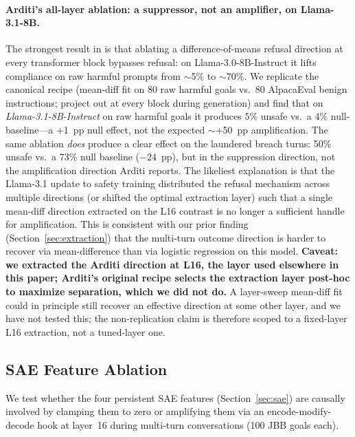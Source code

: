 \documentclass[11pt]{article}
\begin{document}
\paragraph{Arditi's all-layer ablation: a suppressor, not an amplifier, on Llama-3.1-8B.}
The strongest result in \citet{arditi2024refusal} is that ablating a difference-of-means refusal direction at every transformer block bypasses refusal: on Llama-3.0-8B-Instruct it lifts compliance on raw harmful prompts from $\sim$5\% to $\sim$70\%.
We replicate the canonical recipe (mean-diff fit on 80 raw harmful goals vs.\ 80 AlpacaEval benign instructions; project out at every block during generation) and find that on \emph{Llama-3.1-8B-Instruct} on raw harmful goals it produces $5\%$ unsafe vs.\ a $4\%$ null-baseline---a +1~pp null effect, not the expected $\sim$+50~pp amplification.
The same ablation \emph{does} produce a clear effect on the laundered breach turns: 50\% unsafe vs.\ a 73\% null baseline ($-24$~pp), but in the suppression direction, not the amplification direction Arditi reports.
The likeliest explanation is that the Llama-3.1 update to safety training distributed the refusal mechanism across multiple directions (or shifted the optimal extraction layer) such that a single mean-diff direction extracted on the L16 contrast is no longer a sufficient handle for amplification.
This is consistent with our prior finding (Section~\ref{sec:extraction}) that the multi-turn outcome direction is harder to recover via mean-difference than via logistic regression on this model.
\textbf{Caveat: we extracted the Arditi direction at L16, the layer used elsewhere in this paper; Arditi's original recipe selects the extraction layer post-hoc to maximize separation, which we did not do.} A layer-sweep mean-diff fit could in principle still recover an effective direction at some other layer, and we have not tested this; the non-replication claim is therefore scoped to a fixed-layer L16 extraction, not a tuned-layer one.

\subsection{SAE Feature Ablation}
\label{sec:sae_causal}

We test whether the four persistent SAE features (Section~\ref{sec:sae}) are causally involved by clamping them to zero or amplifying them via an encode-modify-decode hook at layer~16 during multi-turn conversations (100 JBB goals each).
\end{document}
